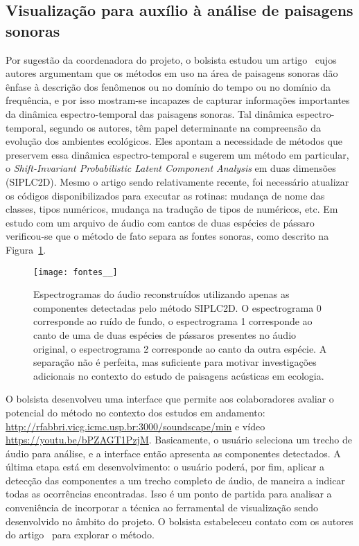 \documentclass[a4paper, 11pt]{article}
\begin{document}
\subsection{Visualização para auxílio à análise de paisagens sonoras}\label{pa}
Por sugestão da coordenadora do projeto,
o bolsista estudou um artigo~\cite{eld} cujos autores argumentam que os métodos em uso na área de paisagens sonoras dão ênfase à descrição dos fenômenos ou no domínio do tempo ou no domínio da frequência, e por isso mostram-se incapazes de capturar informações importantes da dinâmica espectro-temporal das paisagens sonoras. Tal dinâmica espectro-temporal, segundo os autores, têm papel determinante na compreensão da evolução dos ambientes ecológicos.
Eles apontam a necessidade de métodos que preservem essa dinâmica espectro-temporal e sugerem um método em particular, o \emph{Shift-Invariant Probabilistic Latent Component Analysis} em duas dimensões (SIPLC2D).
Mesmo o artigo sendo relativamente recente, foi necessário atualizar os códigos disponibilizados para executar as rotinas: mudança de nome das classes, tipos numéricos, mudança na tradução de tipos de numéricos, etc.
Em estudo com um arquivo de áudio com cantos de duas espécies de pássaro verificou-se que o método de fato separa as fontes sonoras, como descrito na Figura~\ref{ps}.
\begin{figure}[h!]
\centering
  \texttt{[image: fontes\_\_]}
\caption{%
  Espectrogramas do áudio reconstruídos utilizando apenas
  as componentes detectadas pelo método SIPLC2D.
  O espectrograma 0 corresponde ao ruído de fundo,
  o espectrograma 1 corresponde ao canto de uma de duas espécies de pássaros
  presentes no áudio original,
  o espectrograma 2 corresponde ao canto da outra espécie.
  A separação não é perfeita, mas suficiente para motivar investigações adicionais no contexto do estudo de paisagens acústicas em ecologia.
}\label{ps}
\end{figure}

O bolsista desenvolveu uma interface que permite aos colaboradores avaliar o potencial do método no contexto dos estudos em andamento: \url{http://rfabbri.vicg.icmc.usp.br:3000/soundscape/min} e vídeo \url{https://youtu.be/bPZAGT1PzjM}.
Basicamente, o usuário seleciona um trecho de áudio para análise, e a interface
então apresenta as componentes detectados.
A última etapa está em desenvolvimento: o usuário poderá,
por fim, aplicar a detecção das componentes a um trecho completo de áudio,
de maneira a indicar todas as ocorrências encontradas.
Isso é um ponto de partida para analisar a conveniência de incorporar a técnica ao ferramental de visualização sendo desenvolvido no âmbito do projeto.
O bolsista estabeleceu contato com os autores do artigo~\cite{eld} para explorar o método.
\end{document}

